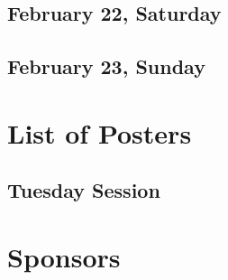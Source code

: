 \documentclass[openany, parskip=full, 12pt, a4]{scrbook}
\begin{document}




\vfill

\section{February 22, Saturday}






\vfill

\section{February 23, Sunday}





\chapter{List of Posters} 

\vspace{-2.5em}

\section{Tuesday Session}




 
% 
 

% 

\chapter{Sponsors}



\newpage


\pagecolor{myblue}
\thispagestyle{empty}
\mbox{}
\end{document}
